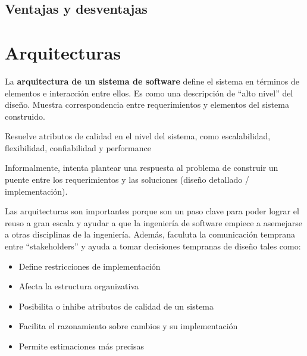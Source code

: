 \documentclass[]{article}
\begin{document}
\subsection{Ventajas y desventajas}

\section{Arquitecturas}
La \textbf{arquitectura de un sistema de software} define el sistema en términos de elementos e interacción entre ellos. Es como una descripción de ``alto nivel'' del diseño. Muestra correspondencia entre requerimientos y elementos del sistema construido.

Resuelve atributos de calidad en el nivel del sistema, como escalabilidad, flexibilidad, confiabilidad y performance

Informalmente, intenta plantear una respuesta al problema de construir un puente entre los requerimientos y las soluciones (diseño detallado / implementación).

Las arquitecturas son importantes porque son un paso clave para poder lograr el reuso a gran escala y ayudar a que la ingeniería de software empiece a asemejarse a otras disciplinas de la ingeniería. Además, faculuta la comunicación temprana entre ``stakeholders'' y ayuda a tomar decisiones tempranas de diseño tales como:
\begin{itemize}
	\item Define restricciones de implementación
	\item Afecta la estructura organizativa
	\item Posibilita o inhibe atributos de calidad de un sistema
	\item Facilita el razonamiento sobre cambios y su implementación
	\item Permite estimaciones más precisas
\end{itemize}
\end{document}
